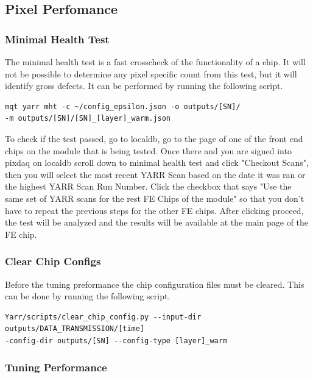 \documentclass[12pt]{article}
\begin{document}
\subsection{Pixel Perfomance}


\subsubsection{Minimal Health Test}

The minimal health test is a fast crosscheck of the functionality of a chip. It will not be possible to determine any pixel specific count from this test, but it will identify gross defects. It can be performed by running the following script. 

\begin{verbatim}
mqt yarr mht -c ~/config_epsilon.json -o outputs/[SN]/
-m outputs/[SN]/[SN]_[layer]_warm.json 
\end{verbatim}

To check if the test passed, go to localdb, go to the page of one of the front end chips on the module that is being tested. Once there and you are signed into pixdaq on localdb scroll down to minimal health test and click "Checkout Scans", then you will select the most recent YARR Scan based on the date it was ran or the highest YARR Scan Run Number. Click the checkbox that says "Use the same set of YARR scans for the rest FE Chips of the module" so that you don't have to repeat the previous steps for the other FE chips. After clicking proceed, the test will be analyzed and the results will be available at the main page of the FE chip. 

\subsubsection{Clear Chip Configs}

Before the tuning preformance the chip configuration files must be cleared. This can be done by running the following script. 

\begin{verbatim}
Yarr/scripts/clear_chip_config.py --input-dir outputs/DATA_TRANSMISSION/[time] 
-config-dir outputs/[SN] --config-type [layer]_warm
\end{verbatim}

\subsubsection{Tuning Performance}
\end{document}
